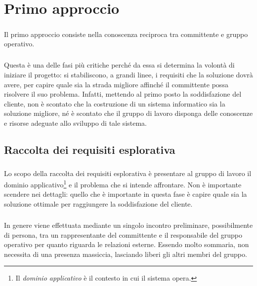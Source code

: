 \documentclass[12pt,a4paper,twoside,english,italian]{book}
\begin{document}
\chapter{Primo approccio}

\paragraph{} Il primo approccio consiste nella conoscenza reciproca tra committente e gruppo operativo. 

\paragraph{} Questa è una delle fasi più critiche perché da essa si determina la volontà di iniziare il progetto: si stabiliscono, a grandi linee, i requisiti che la soluzione dovrà avere, per capire quale sia la strada migliore affinché il committente possa risolvere il suo problema. Infatti, mettendo al primo posto la soddisfazione del cliente, non è scontato che la costruzione di un sistema informatico sia la soluzione migliore, né è scontato che il gruppo di lavoro disponga delle conoscenze e risorse adeguate allo sviluppo di tale sistema. 


\section{Raccolta dei requisiti esplorativa}

\paragraph{} Lo scopo della raccolta dei requisiti esplorativa è presentare al gruppo di lavoro il dominio applicativo\footnote{Il \emph{dominio applicativo} è il contesto in cui il sistema opera.} e il problema che si intende affrontare. Non è importante scendere nei dettagli: quello che è importante in questa fase è capire quale sia la soluzione ottimale per raggiungere la soddisfazione del cliente. 

\paragraph{} In genere viene effettuata mediante un singolo incontro preliminare, possibilmente di persona, tra un rappresentante del committente e il responsabile del gruppo operativo per quanto riguarda le relazioni esterne. Essendo molto sommaria, non necessita di una presenza massiccia, lasciando liberi gli altri membri del gruppo. 
\end{document}
